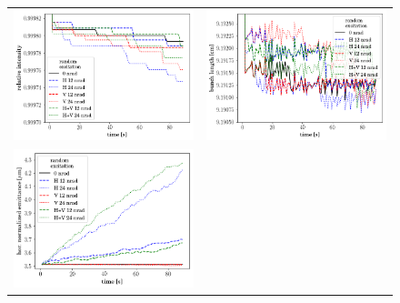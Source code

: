 \documentclass[
prstab
,reprint
,linenumbers
,longbibliography
,preprintnumbers
,showkeys
,amsfonts,amssymb,amsmath
,floatfix
]{revtex4-1}
\newlength{\halfwidth}
\begin{document}
\begin{figure}
  \begin{tabular}{cc}
    \includegraphics[width=\halfwidth]{2017injerra2b2u_ranadt_3_5um_intensity.png} &
    \includegraphics[width=\halfwidth]{2017injerra2b2u_ranadt_3_5um_sigm.png}\\
    \includegraphics[width=\halfwidth]{2017injerra2b2u_ranadt_3_5um_emit1.png} &

\end{tabular}
\end{figure}
\end{document}
